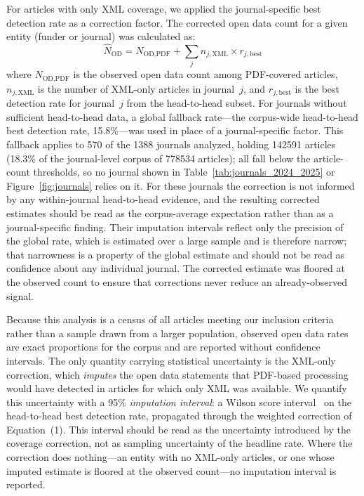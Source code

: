 For articles with only XML coverage, we applied the journal-specific best detection rate as a correction factor. The corrected open data count for a given entity (funder or journal) was calculated as:
\begin{equation}
\hat{N}_{\text{OD}} = N_{\text{OD,PDF}} + \sum_{j} n_{j,\text{XML}} \times r_{j,\text{best}}
\end{equation}
where $N_{\text{OD,PDF}}$ is the observed open data count among PDF-covered articles, $n_{j,\text{XML}}$ is the number of XML-only articles in journal~$j$, and $r_{j,\text{best}}$ is the best detection rate for journal~$j$ from the head-to-head subset. For journals without sufficient head-to-head data, a global fallback rate---the corpus-wide head-to-head best detection rate, 15.8\%---was used in place of a journal-specific factor. This fallback applies to 570 of the \num{1388} journals analyzed, holding \num{142591} articles (18.3\% of the journal-level corpus of \num{778534} articles); all fall below the article-count thresholds, so no journal shown in Table~\ref{tab:journals_2024_2025} or Figure~\ref{fig:journals} relies on it. For these journals the correction is not informed by any within-journal head-to-head evidence, and the resulting corrected estimates should be read as the corpus-average expectation rather than as a journal-specific finding. Their imputation intervals reflect only the precision of the global rate, which is estimated over a large sample and is therefore narrow; that narrowness is a property of the global estimate and should not be read as confidence about any individual journal. The corrected estimate was floored at the observed count to ensure that corrections never reduce an already-observed signal.

Because this analysis is a census of all articles meeting our inclusion criteria rather than a sample drawn from a larger population, observed open data rates are exact proportions for the corpus and are reported without confidence intervals. The only quantity carrying statistical uncertainty is the XML-only correction, which \emph{imputes} the open data statements that PDF-based processing would have detected in articles for which only XML was available. We quantify this uncertainty with a 95\% \emph{imputation interval}: a Wilson score interval~\cite{Wilson1927} on the head-to-head best detection rate, propagated through the weighted correction of Equation~(1). This interval should be read as the uncertainty introduced by the coverage correction, not as sampling uncertainty of the headline rate. Where the correction does nothing---an entity with no XML-only articles, or one whose imputed estimate is floored at the observed count---no imputation interval is reported.


